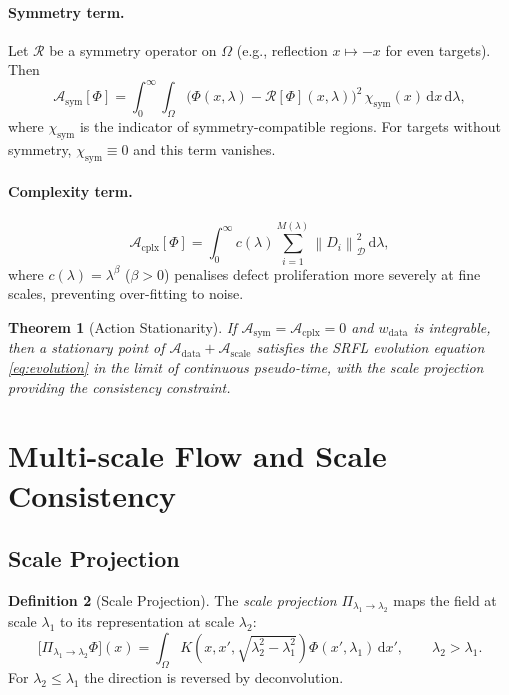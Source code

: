 \documentclass[12pt,a4paper]{article}
\theoremstyle{plain}
\newtheorem{theorem}{Theorem}[section]
\theoremstyle{definition}
\newtheorem{definition}[theorem]{Definition}
\theoremstyle{remark}
\newcommand{\cD}{\mathcal{D}}
\newcommand{\cA}{\mathcal{A}}
\newcommand{\cR}{\mathcal{R}}
\newcommand{\norm}[1]{\left\|#1\right\|}
\newcommand{\dd}{\mathrm{d}}
\begin{document}
\paragraph{Symmetry term.}
Let $\cR$ be a symmetry operator on $\Omega$ (e.g., reflection $x \mapsto -x$
for even targets).  Then
\begin{equation}
  \cA_\text{sym}[\Phi]
  = \int_0^\infty\!\int_\Omega
    \bigl(\Phi(x,\lambda) - \cR[\Phi](x,\lambda)\bigr)^2\,
    \chi_\text{sym}(x)\,\dd x\,\dd\lambda,
  \label{eq:action_sym}
\end{equation}
where $\chi_\text{sym}$ is the indicator of symmetry-compatible regions.
For targets without symmetry, $\chi_\text{sym} \equiv 0$ and this term vanishes.

\paragraph{Complexity term.}
\begin{equation}
  \cA_\text{cplx}[\Phi]
  = \int_0^\infty c(\lambda)
    \sum_{i=1}^{M(\lambda)} \norm{D_i}^2_\cD\,\dd\lambda,
  \label{eq:action_cplx}
\end{equation}
where $c(\lambda) = \lambda^\beta$ ($\beta > 0$) penalises defect
proliferation more severely at fine scales, preventing over-fitting to
noise.

\begin{theorem}[Action Stationarity]
  If $\cA_\text{sym} = \cA_\text{cplx} = 0$ and $w_\text{data}$ is
  integrable, then a stationary point of $\cA_\text{data} + \cA_\text{scale}$
  satisfies the SRFL evolution equation \eqref{eq:evolution} in
  the limit of continuous pseudo-time, with the scale projection
  providing the consistency constraint.
\end{theorem}

\section{Multi-scale Flow and Scale Consistency}
\label{sec:multiscale}

\subsection{Scale Projection}

\begin{definition}[Scale Projection]
  The \emph{scale projection} $\Pi_{\lambda_1 \to \lambda_2}$ maps the
  field at scale $\lambda_1$ to its representation at scale $\lambda_2$:
  \begin{equation}
    \bigl[\Pi_{\lambda_1 \to \lambda_2}\Phi\bigr](x)
    = \int_\Omega K\!\left(x, x', \sqrt{\lambda_2^2 - \lambda_1^2}\right)
      \Phi(x', \lambda_1)\,\dd x',
      \qquad \lambda_2 > \lambda_1.
    \label{eq:projection}
  \end{equation}
  For $\lambda_2 \leq \lambda_1$ the direction is reversed by deconvolution.
\end{definition}
\end{document}
